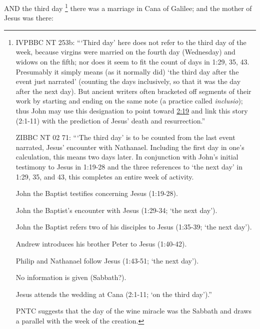 			AND the third day%
				\footnote{%
					IVPBBC NT 253b: ```Third day' here does not refer to the third day of the week, because virgins were married on the fourth day (Wednesday) and widows on the fifth; nor does it seem to fit the count of days in 1:29, 35, 43. Presumably it simply means (as it normally did) `the third day after the event just narrated' (counting the days inclusively, so that it was the day after the next day). But ancient writers often bracketed off segments of their work by starting and ending on the same note (a practice called \textit{inclusio}); thus John may use this designation to point toward \hyperref[JOHN-2-19]{2:19} and link this story (2:1-11) with the prediction of Jesus' death and resurrection.''
					
					ZIBBC NT 02 71: ```The third day' is to be counted from the last event narrated, Jesus' encounter with Nathanael. Including the first day in one's calculation, this means two days later. In conjunction with John's initial testimony to Jesus in 1:19-28 and the three references to `the next day' in 1:29, 35, and 43, this completes an entire week of activity.
						\begin{compactdesc}
							\item[Day 1:] John the Baptist testifies concerning Jesus (1:19-28).
							\item[Day 2:] John the Baptist's encounter with Jesus (1:29-34; `the next day').
							\item[Day 3:] John the Baptist refers two of his disciples to Jesus (1:35-39; `the next day').
							\item[Day 4:] Andrew introduces his brother Peter to Jesus (1:40-42).
							\item[Day 5:] Philip and Nathanael follow Jesus (1:43-51; `the next day').
							\item[Day 6:] No information is given (Sabbath?).
							\item[Day 7:] Jesus attends the wedding at Cana (2:1-11; `on the third day').''
						\end{compactdesc}
					PNTC suggests that the day of the wine miracle was the Sabbath and draws a parallel with the week of the creation.
					}
			there was a marriage in Cana of Galilee; and the mother of Jesus was there:

